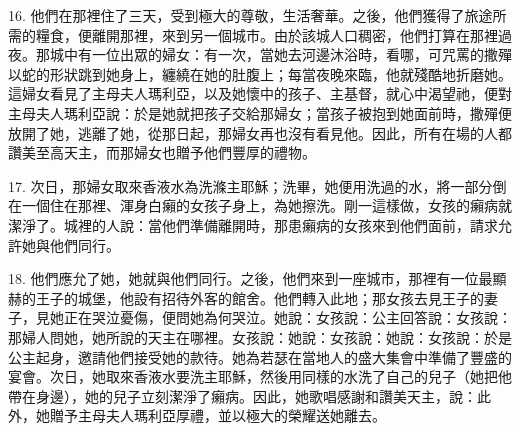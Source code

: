 16. 他們在那裡住了三天，受到極大的尊敬，生活奢華。之後，他們獲得了旅途所需的糧食，便離開那裡，來到另一個城市。由於該城人口稠密，他們打算在那裡過夜。那城中有一位出眾的婦女：有一次，當她去河邊沐浴時，看哪，可咒罵的撒殫以蛇的形狀跳到她身上，纏繞在她的肚腹上；每當夜晚來臨，他就殘酷地折磨她。這婦女看見了主母夫人瑪利亞，以及她懷中的孩子、主基督，就心中渴望祂，便對主母夫人瑪利亞說：於是她就把孩子交給那婦女；當孩子被抱到她面前時，撒殫便放開了她，逃離了她，從那日起，那婦女再也沒有看見他。因此，所有在場的人都讚美至高天主，而那婦女也贈予他們豐厚的禮物。\par

17. 次日，那婦女取來香液水為洗滌主耶穌；洗畢，她便用洗過的水，將一部分倒在一個住在那裡、渾身白癩的女孩子身上，為她擦洗。剛一這樣做，女孩的癩病就潔淨了。城裡的人說：當他們準備離開時，那患癩病的女孩來到他們面前，請求允許她與他們同行。\par

18. 他們應允了她，她就與他們同行。之後，他們來到一座城市，那裡有一位最顯赫的王子的城堡，他設有招待外客的館舍。他們轉入此地；那女孩去見王子的妻子，見她正在哭泣憂傷，便問她為何哭泣。她說：女孩說：公主回答說：女孩說：那婦人問她，她所說的天主在哪裡。女孩說：她說：女孩說：她說：女孩說：於是公主起身，邀請他們接受她的款待。她為若瑟在當地人的盛大集會中準備了豐盛的宴會。次日，她取來香液水要洗主耶穌，然後用同樣的水洗了自己的兒子（她把他帶在身邊），她的兒子立刻潔淨了癩病。因此，她歌唱感謝和讚美天主，說：此外，她贈予主母夫人瑪利亞厚禮，並以極大的榮耀送她離去。\par

